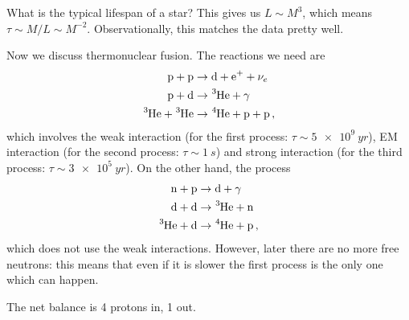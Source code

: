 \documentclass[main.tex]{subfiles}
\begin{document}
What is the typical lifespan of a star? This gives us \(L \sim M^3\), which means \(\tau \sim M/L \sim M^{-2}\). 
Observationally, this matches the data pretty well. 

Now we discuss thermonuclear fusion. The reactions we need are 
%
\begin{subequations}
\begin{align}
  \ce{p + p} &\rightarrow \ce{d + e+ +} \nu_e  \\
  \ce{p + d} &\rightarrow \ce{^3He +} \gamma  \\
  \ce{^3He + ^3He} &\rightarrow \ce{^4He + p + p} 
\,,
\end{align}
\end{subequations}
%
which involves the weak interaction (for the first process: \(\tau \sim \SI{5e9}{yr}\)), EM interaction (for the second process: \(\tau \sim \SI{1}{s}\)) and strong interaction (for the third process: \(\tau \sim  \SI{3e5}{yr}\)). On the other hand, the process 
%
\begin{subequations}
\begin{align}
  \ce{n + p} &\rightarrow \ce{d} + \gamma   \\
  \ce{d + d} &\rightarrow \ce{^3He + n}  \\
  \ce{^3He + d}  &\rightarrow \ce{^4He + p}
\,,
\end{align}
\end{subequations}
%
which does not use the weak interactions. However, later there are no more free neutrons: this means that even if it is slower the first process is the only one which can happen. 

The net balance is 4 protons in, 1  out. 
\end{document}
